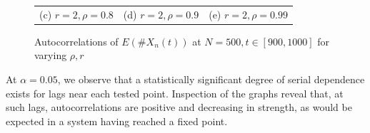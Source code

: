 \begin{figure}
\begin{tabular}{ccc}
        (c) $r = 2, \rho = 0.8$                                          & (d) $r = 2, \rho = 0.9$                                          & (e) $r = 2, \rho = 0.99$ \\[6pt]
    \end{tabular}
    \caption{Autocorrelations of $E(\#X_{n}(t))$ at $N = 500, t \in [900,1000]$ for varying $\rho, r$}
    \label{fig:autocor}
\end{figure}

At $\alpha = 0.05$, we observe that a statistically significant degree of serial dependence exists for lags near each tested point.
Inspection of the graphs reveal that, at such lags, autocorrelations are positive and decreasing in strength, as would be expected in a system having reached a fixed point.